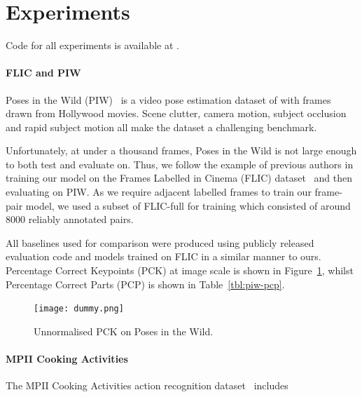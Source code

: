 \documentclass[runningheads]{llncs}
\begin{document}
\section{Experiments}\label{sec:experiments}


Code for all experiments is available at .

\paragraph{FLIC and PIW} Poses in the Wild (PIW)~\cite{cherian2014mixing} is a
video pose estimation dataset of with frames drawn from Hollywood movies. Scene
clutter, camera motion, subject occlusion and rapid subject motion all make the
dataset a challenging benchmark.

Unfortunately, at under a thousand frames, Poses in the Wild is not large enough
to both test and evaluate on. Thus, we follow the example of previous authors in
training our model on the Frames Labelled in Cinema (FLIC)
dataset~\cite{sapp2013modec} and then evaluating on PIW\@. As we require
adjacent labelled frames to train our frame-pair model, we used a subset of
FLIC-full for training which consisted of around 8000 reliably annotated pairs.

All baselines used for comparison were produced using publicly released
evaluation code and models trained on FLIC in a similar manner to ours.
Percentage Correct Keypoints (PCK) at image scale is shown in
Figure~\ref{fig:piw-pck}, whilst Percentage Correct Parts (PCP) is shown in
Table~\ref{tbl:piw-pcp}.


\begin{figure}[t]
\begin{center}
\texttt{[image: dummy.png]}
\end{center}
\caption{Unnormalised PCK on Poses in the Wild.}
\label{fig:piw-pck}
\end{figure}

\paragraph{MPII Cooking Activities} The MPII Cooking Activities action
recognition dataset~\cite{rohrbach2012database} includes %
\end{document}
